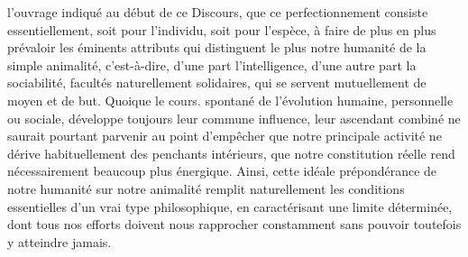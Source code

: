 \documentclass[french,twoside]{book} %
\begin{document}
l’ouvrage indiqué au début de ce Discours, que ce perfectionnement consiste essentiellement, soit pour l’individu, soit pour l’espèce, à faire de plus en plus prévaloir les éminents attributs qui distinguent le plus notre humanité de la simple animalité, c’est-à-dire, d’une part l’intelligence, d’une autre part la sociabilité, facultés naturellement solidaires, qui se servent mutuellement de moyen et de but. Quoique le cours. spontané de l’évolution humaine, personnelle ou sociale, développe toujours leur commune influence, leur ascendant combiné ne saurait pourtant parvenir au point d’empêcher que notre principale activité ne dérive habituellement des penchants intérieurs, que notre constitution réelle rend nécessairement beaucoup plus énergique. Ainsi, cette idéale prépondérance de notre humanité sur notre animalité remplit naturellement les conditions essentielles d’un vrai type philosophique, en caractérisant une limite déterminée, dont tous nos efforts doivent nous rapprocher constamment sans pouvoir toutefois y atteindre jamais.\par
\end{document}
